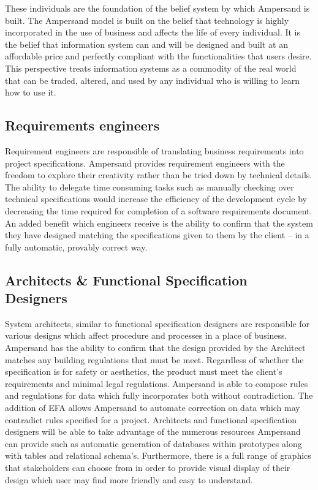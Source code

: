 \documentclass[12pt]{report}
\begin{document}
These individuals are the foundation of
the belief system by which Ampersand is built. The Ampersand model is built on
the belief that technology is highly incorporated in the use of business and
affects the life of every individual.  It is the belief that information system
can and will be designed and built at an affordable price and perfectly
compliant with the functionalities that users desire. This perspective treats
information systems as a commodity of the real world that can be traded,
altered, and used by any individual who is willing to learn how to use it.
\subsection{Requirements engineers}\label{subsec:BusReq}
Requirement engineers are responsible of translating business 
requirements into project specifications. Ampersand provides requirement 
engineers with the freedom to explore their creativity rather than be tried 
down by technical details. The ability to delegate time consuming tasks such as 
manually checking over technical specifications would increase the efficiency 
of the development cycle by decreasing the time required for 
completion of a software requirements document. 
An added benefit which engineers receive is the ability to confirm 
that the system they have designed matching the specifications given to them by 
the client -- in a fully automatic, provably correct way. 
\subsection{Architects \& Functional Specification Designers}
System architects, similar to functional specification designers are 
responsible for various designs which affect procedure and processes in a place 
of business. Ampersand has the ability to confirm that the design provided by 
the Architect matches any building regulations that must be meet. Regardless of 
whether the specification is for safety or aesthetics, the product must meet the 
client's requirements and minimal legal regulations. Ampersand is able to 
compose rules and regulations for data which fully incorporates both without 
contradiction. The addition of EFA allows Ampersand to automate correction  
on data which may contradict rules specified for a project. Architects and 
functional specification designers will be able to take advantage of the 
numerous resources Ampersand can provide such as automatic generation of 
databases within prototypes along with tables and relational schema's. 
Furthermore, there is a full range of graphics that stakeholders can choose 
from in order to provide visual display of their design which user may find 
more friendly and easy to understand. 
\end{document}
